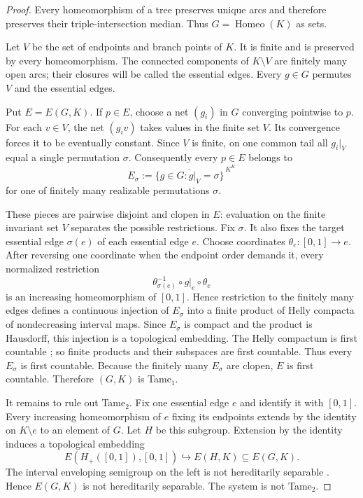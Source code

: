 \documentclass[11pt]{article}
\newcommand{\Homeo}{\operatorname{Homeo}}
\begin{document}
\begin{proof}
Every homeomorphism of a tree preserves unique arcs and therefore preserves
their triple-intersection median. Thus $G=\Homeo(K)$ as sets.

Let $V$ be the set of endpoints and branch points of $K$. It is finite and is
preserved by every homeomorphism. The connected components of $K\setminus V$
are finitely many open arcs; their closures will be called the essential
edges. Every $g\in G$ permutes $V$ and the essential edges.

Put $E=E(G,K)$. If $p\in E$, choose a net $(g_i)$ in $G$ converging pointwise
to $p$. For each $v\in V$, the net $(g_i v)$ takes values in the finite set
$V$. Its convergence forces it to be eventually constant. Since $V$ is
finite, on one common tail all $g_i|_V$ equal a single permutation $\sigma$.
Consequently every $p\in E$ belongs to
\[
E_\sigma:=\overline{\{g\in G:g|_V=\sigma\}}^{\,K^K}
\]
for one of finitely many realizable permutations $\sigma$.

These pieces are pairwise disjoint and clopen in $E$: evaluation on the finite
invariant set $V$ separates the possible restrictions. Fix $\sigma$. It also
fixes the target essential edge $\sigma(e)$ of each essential edge $e$. Choose
coordinates $\theta_e:[0,1]\to e$. After reversing one coordinate when the
endpoint order demands it, every normalized restriction
\[
\theta_{\sigma(e)}^{-1}\circ g|_e\circ\theta_e
\]
is an increasing homeomorphism of $[0,1]$. Hence restriction to the finitely
many edges defines a continuous injection of $E_\sigma$ into a finite product
of Helly compacta of nondecreasing interval maps. Since $E_\sigma$ is compact
and the product is Hausdorff, this injection is a topological embedding.
The Helly compactum is first countable \cite[Example 5.13]{Megrelishvili}; so
finite products and their subspaces are first countable. Thus every
$E_\sigma$ is first countable. Because the finitely many $E_\sigma$ are clopen,
$E$ is first countable. Therefore $(G,K)$ is Tame$_1$.

It remains to rule out Tame$_2$. Fix one essential edge $e$ and identify it
with $[0,1]$. Every increasing homeomorphism of $e$ fixing its endpoints
extends by the identity on $K\setminus e$ to an element of $G$. Let $H$ be this
subgroup. Extension by the identity induces a topological embedding
\[
E(H_+([0,1]),[0,1])\hookrightarrow E(H,K)\subseteq E(G,K).
\]
The interval enveloping semigroup on the left is not hereditarily separable
\cite[Example 5.13]{Megrelishvili}. Hence $E(G,K)$ is not hereditarily
separable. The system is not Tame$_2$.
\end{proof}
\end{document}
